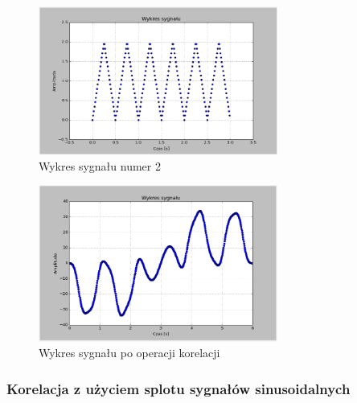 \documentclass{article}
\begin{document}
{{\begin{figure}[h!]
        \centering
        \includegraphics[width=0.7\textwidth]{img/splot6.png}
        \caption{Wykres sygnału numer 2}
    \end{figure}

    \begin{figure}[h!]
        \centering
        \includegraphics[width=0.7\textwidth]{img/kor_bez_3.png}
        \caption{Wykres sygnału po operacji korelacji}
    \end{figure}
    \FloatBarrier
    
}
    \subsubsection{Korelacja z użyciem splotu sygnałów sinusoidalnych} \label{eksperyment:korelacja4}{

}}
\end{document}
